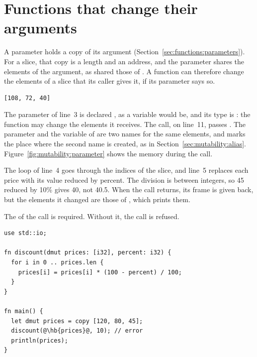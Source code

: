 \vfill\pagebreak
\section{Functions that change their arguments}
\label{sec:mutability:parameters}

A parameter holds a copy of its argument (Section~\ref{sec:functions:parameters}).
For a slice, that copy is a length and an address, and the parameter shares the
elements of the argument, as  shared those of . A
function can therefore change the elements of a slice that its caller gives it,
if its parameter says so.


\vspace{-10pt}%
\begin{lstlisting}[style=bashVerb]
[108, 72, 40]
\end{lstlisting}

The parameter  of line~3 is declared , as a variable
would be, and its type is : the function may change the
elements it receives. The call, on line~11, passes . The
parameter and the variable of  are two names for the same elements,
and  marks the place where the second name is created, as in
Section~\ref{sec:mutability:alias}. Figure~\ref{fig:mutability:parameter} shows
the memory during the call.



The loop of line~4 goes through the indices of the slice, and line~5 replaces
each price with its value reduced by  percent. The division is
between integers, so 45 reduced by 10\% gives 40, not 40.5. When the call
returns, its frame is given back, but the elements it changed are those of
, which prints them.

The  of the call is required. Without it, the call is refused.

\begin{lstlisting}[style=coloredverbatimError, escapechar=@, caption=A call that shares elements without \token{alias}]
use std::io;

fn discount(dmut prices: [i32], percent: i32) {
  for i in 0 .. prices.len {
    prices[i] = prices[i] * (100 - percent) / 100;
  }
}

fn main() {
  let dmut prices = copy [120, 80, 45];
  discount(@\hb{prices}@, 10); // error
  println(prices);
}
\end{lstlisting}

